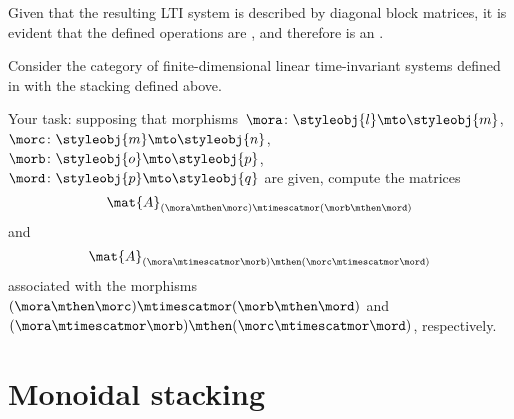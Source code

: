 Given that the resulting LTI system is described by diagonal block matrices, it is evident that the defined operations are , and therefore \LTI is an  .

\begin{gradedexercise}
    \label{ex:StackingLTI}

Consider the category of finite-dimensional linear time-invariant systems defined in  with the stacking defined above.

Your task: 
supposing that morphisms~$\mora\colon \styleobj{l}\mto \styleobj{m}$,~$\morc\colon \styleobj{m}\mto \styleobj{n}$,~$\morb\colon \styleobj{o}\mto \styleobj{p}$,~$\mord\colon \styleobj{p}\mto \styleobj{q}$ are given, compute the matrices
\begin{equation}
\mat{A}_{(\mora \mthen \morc)\mtimescatmor (\morb\mthen \mord)}
\end{equation}
and 
\begin{equation}
\mat{A}_{(\mora\mtimescatmor \morb)\mthen (\morc\mtimescatmor \mord)}
\end{equation}
associated with the morphisms $(\mora \mthen \morc)\mtimescatmor (\morb\mthen \mord)$ and $(\mora\mtimescatmor \morb)\mthen (\morc\mtimescatmor \mord)$, respectively. 


\end{gradedexercise}


\section{Monoidal stacking}\label{sec:moinoidal-stacking}

